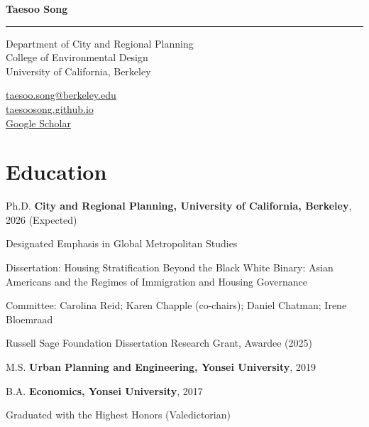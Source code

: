 \documentclass[11pt,letterpaper]{article}
\newcommand{\term}[1]{(#1)}
\newcommand{\namefont}[1]{{\normalfont\bfseries\Huge #1}}
\begin{document}
\raggedright

\namefont{Taesoo Song}
\noindent\rule{\linewidth}{0.8pt}

\begin{minipage}[t]{0.66\textwidth}
Department of City and Regional Planning\\
College of Environmental Design\\
University of California, Berkeley
\end{minipage}
\begin{minipage}[t]{0.33\textwidth}
\raggedleft
\href{mailto:taesoo.song@berkeley.edu}{taesoo.song@berkeley.edu}\\
\href{https://taesoosong.github.io}{taesoosong.github.io}\\
\href{https://scholar.google.com/citations?user=xM5Rc-EAAAAJ}{Google Scholar}
\end{minipage}

\section{Education}
\begin{tablist}
  \item[Ph.D.] \tab{}\textbf{City and Regional Planning, University of California, Berkeley}, 2026 (Expected)
    \begin{subpoints}
      \item Designated Emphasis in Global Metropolitan Studies
    \end{subpoints}
    \begin{subpoints2}
      \item Dissertation: Housing Stratification Beyond the Black White Binary: Asian Americans and the Regimes of Immigration and Housing Governance
      \item Committee: Carolina Reid; Karen Chapple (co-chairs); Daniel Chatman; Irene Bloemraad
      \item Russell Sage Foundation Dissertation Research Grant, Awardee \term{2025}%
    \end{subpoints2}

  \item[M.S.] \tab{}\textbf{Urban Planning and Engineering, Yonsei University}, 2019

  \item[B.A.] \tab{}\textbf{Economics, Yonsei University}, 2017
    \begin{subpoints}
      \item Graduated with the Highest Honors \term{Valedictorian}
    \end{subpoints}
\end{tablist}
\end{document}
